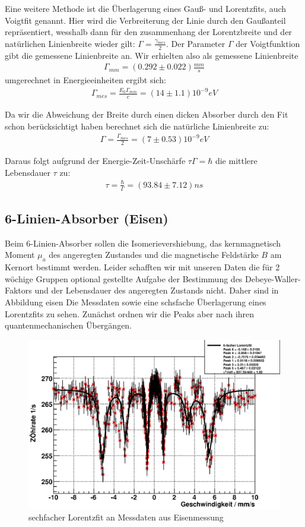 \documentclass[12pt]{article}
\begin{document}
Eine weitere Methode ist die Überlagerung eines Gauß- und Lorentzfits, auch Voigtfit genannt. Hier wird die Verbreiterung der Linie durch den
Gaußanteil repräsentiert, wesshalb dann für den zusammenhang der Lorentzbreite und der natürlichen Linienbreite wieder gilt: $\Gamma = \frac{\gamma_{mes}}{2}$.
Der Parameter $\Gamma$ der Voigtfunktion gibt die gemessene Linienbreite an. Wir erhielten also als gemessene Linienbreite
\begin{align*}
 \Gamma_{mm} = (0.292 \pm 0.022) \frac{mm}{s}
\end{align*}
umgerechnet in Energieeinheiten ergibt sich:
\begin{align*}
 \Gamma_{mes} = \frac{E_0\Gamma_{mm}}{c} = (14 \pm 1.1) 10^{-9}eV
\end{align*}

Da wir die Abweichung der Breite durch einen dicken Absorber durch den Fit schon berücksichtigt haben berechnet sich die natürliche Linienbreite zu:
\begin{align*}
 \Gamma = \frac{\Gamma_{mes}}{2} = (7 \pm 0.53) 10^{-9}eV
\end{align*}

Daraus folgt aufgrund der Energie-Zeit-Unschärfe $\tau \Gamma = \hbar$ die mittlere Lebensdauer $\tau$ zu:
\begin{align*}
 \tau = \frac{\hbar}{\Gamma} = (93.84 \pm 7.12) ns
\end{align*}

\subsection{6-Linien-Absorber (Eisen)}

Beim 6-Linien-Absorber sollen die Isomerievershiebung, das kernmagnetisch Moment $\mu_a$ des angeregten Zustandes und die magnetische Feldstärke $B$
am Kernort bestimmt werden. Leider schafften wir mit unseren Daten die für 2 wöchige Gruppen optional gestellte Aufgabe der Bestimmung des
Debeye-Waller-Faktors und der Lebensdauer des angeregten Zustands nicht. Daher sind in Abbildung \refname{eisen} Die Messdaten sowie eine schsfache
Überlagerung eines Lorentzfits zu sehen. Zunächst ordnen wir die Peaks aber nach ihren quantenmechanischen Übergängen. 
\begin{figure}[H]
 \includegraphics[width=0.9\linewidth]{pictures/eisen.eps}
 \caption{sechfacher Lorentzfit an Messdaten aus Eisenmessung}
\end{figure}
\end{document}
